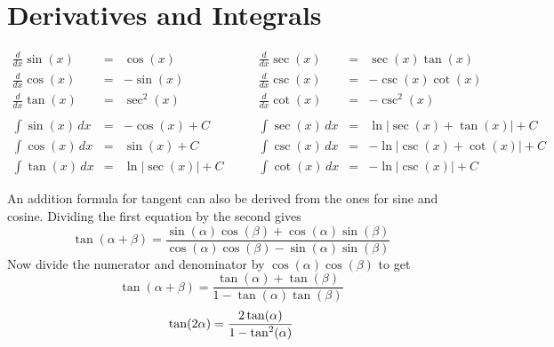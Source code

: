 \documentclass{article}
\begin{document}
	\section*{Derivatives and Integrals}
	\[
		\begin{array}{rclrcl}
			\frac{d}{dx}\sin(x) &=& \cos(x)\quad &\quad
			\frac{d}{dx}\sec(x) &=& \sec(x)\tan(x)\\
			\frac{d}{dx}\cos(x) &=& -\sin(x)\quad &\quad
			\frac{d}{dx}\csc(x) &=& -\csc(x)\cot(x) \\
			\frac{d}{dx}\tan(x) &=& \sec^2(x)\quad &\quad
			\frac{d}{dx}\cot(x) &=& -\csc^2(x) \\
			\\
			\int\sin(x)\,dx &=& -\cos(x)+C\quad &\quad
			\int\sec(x)\,dx &=& \ln|\sec(x)+\tan(x)|+C\\
			\int\cos(x)\,dx &=& \sin(x)+C\quad &\quad
			\int\csc(x)\,dx &=& -\ln|\csc(x)+\cot(x)|+C \\
			\int\tan(x)\,dx &=& \ln|\sec(x)|+C\quad &\quad 
			\int\cot(x)\,dx &=& -\ln|\csc(x)|+C
		\end{array}
	\]

	An addition formula for tangent can also be derived from the
	ones for sine and cosine. Dividing the first equation by the second gives
	\[
		\tan(\alpha+\beta) = \frac{\sin(\alpha)\cos(\beta) + \cos(\alpha)\sin(\beta)}
		{\cos(\alpha)\cos(\beta) - \sin(\alpha)\sin(\beta)}
	\]
	Now divide the numerator and denominator by $\cos(\alpha)\cos(\beta)$ to get
	\[
		\tan(\alpha+\beta) = \frac{\tan(\alpha) + \tan(\beta)}{1 -
		\tan(\alpha)\tan(\beta)}
	\]
	\[
		\tan(2\alpha) = \frac{2\tan(\alpha)}{1-\tan^2(\alpha)} \\
	\]



	
\end{document}
